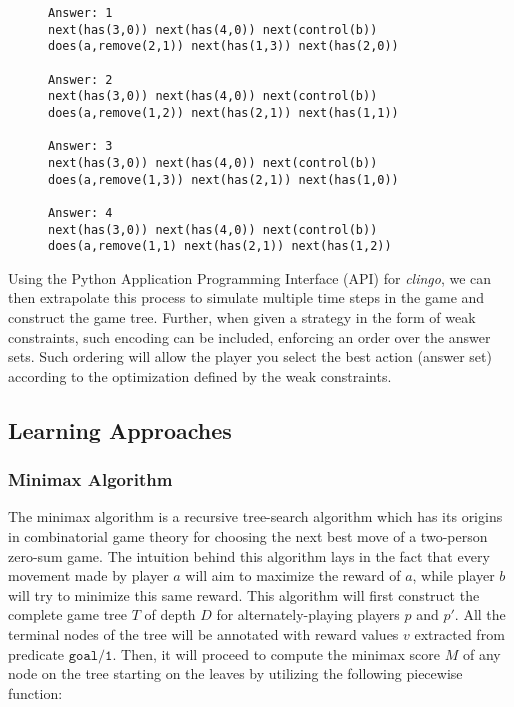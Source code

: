 \begin{figure}[H]
\centering
\begin{varwidth}{\linewidth}
\begin{verbatim}
Answer: 1
next(has(3,0)) next(has(4,0)) next(control(b))
does(a,remove(2,1)) next(has(1,3)) next(has(2,0))

Answer: 2
next(has(3,0)) next(has(4,0)) next(control(b)) 
does(a,remove(1,2)) next(has(2,1)) next(has(1,1))

Answer: 3
next(has(3,0)) next(has(4,0)) next(control(b)) 
does(a,remove(1,3)) next(has(2,1)) next(has(1,0))

Answer: 4
next(has(3,0)) next(has(4,0)) next(control(b)) 
does(a,remove(1,1) next(has(2,1)) next(has(1,2))
\end{verbatim}
\end{varwidth}
\end{figure}

Using the Python Application Programming Interface (API) for \textit{clingo}, we can then extrapolate this process to simulate multiple time steps in the game and construct the game tree. Further, when given a strategy in the form of weak constraints, such encoding can be included, enforcing an order over the answer sets. Such ordering will allow the player you select the best action (answer set) according to the optimization defined by the weak constraints.


\subsection{Learning Approaches}

\subsubsection{Minimax Algorithm}

The minimax algorithm is a recursive tree-search algorithm which has its origins in combinatorial game theory for choosing the next best move of a two-person zero-sum game. The intuition behind this algorithm lays in the fact that every movement made by player $a$ will aim to maximize the reward of $a$, while player $b$ will try to minimize this same reward. This algorithm will first construct the complete game tree $T$ of depth $D$ for alternately-playing players $p$ and $p'$. All the terminal nodes of the tree will be annotated with reward values $v$ extracted from predicate $\texttt{goal/1}$. Then, it will proceed to compute the minimax score $M$ of any node on the tree starting on the leaves by utilizing the following piecewise function:


